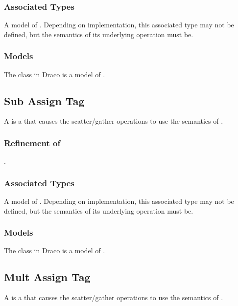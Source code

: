 \documentclass[11pt]{rnote}
\begin{document}
\subsubsection{Associated Types}

A model of . Depending on implementation, this
associated type may not be defined, but the semantics of its
underlying operation must be.

\subsubsection{Models}

The  class in Draco is a model of
.

\subsection{Sub Assign Tag}

A  is a  that
causes the  scatter/gather operations to use the semantics
of .

\subsubsection{Refinement of}
.

\subsubsection{Associated Types}

A model of . Depending on implementation, this
associated type may not be defined, but the semantics of its
underlying operation must be.

\subsubsection{Models}

The  class in Draco is a model of
.

\subsection{Mult Assign Tag}

A  is a  that
causes the  scatter/gather operations to use the semantics
of .
\end{document}
